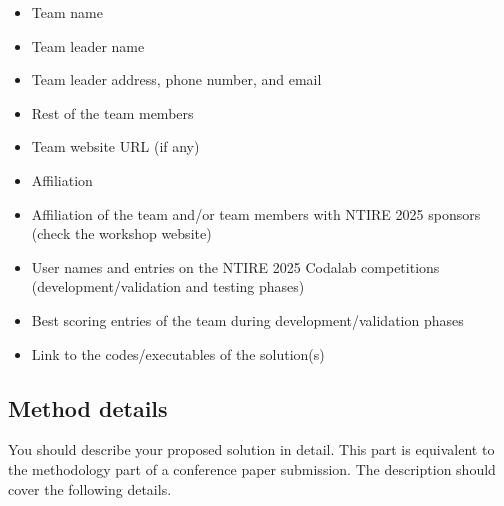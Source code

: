 \documentclass[10pt,twocolumn,letterpaper]{article}
\begin{document}
\begin{itemize}
    \item Team name                                  
    \item Team leader name                           
    \item Team leader address, phone number, and email 
    \item Rest of the team members        
    \item Team website URL (if any)                   
    \item Affiliation
    \item Affiliation of the team and/or team members with NTIRE 2025 sponsors (check the workshop website)
    \item User names and entries on the NTIRE 2025 Codalab competitions (development/validation and testing phases)
    \item Best scoring entries of the team during development/validation phases
    \item Link to the codes/executables of the solution(s)
\end{itemize}

\subsection{Method details}

You should describe your proposed solution in detail. This part is equivalent to the methodology part of a conference paper submission. The description should cover the following details.
\end{document}
